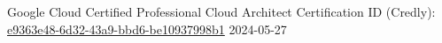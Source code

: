 \certificationitem
{Google Cloud Certified Professional Cloud Architect}
{\companygoogle}
{Certification ID (Credly): \href{https://www.credly.com/badges/e9363e48-6d32-43a9-bbd6-be10937998b1}{e9363e48-6d32-43a9-bbd6-be10937998b1}}
{2024-05-27}
